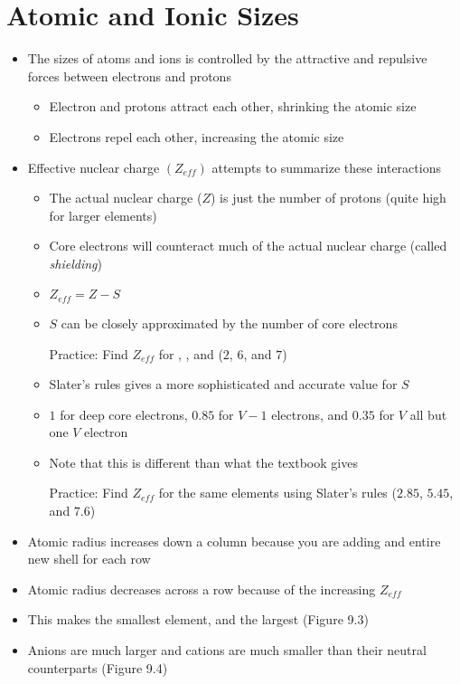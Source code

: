 \documentclass[12pt, openany, letterpaper]{memoir}
\begin{document}
\section{Atomic and Ionic Sizes}
\begin{itemize}
	\item The sizes of atoms and ions is controlled by the attractive and repulsive forces between electrons and protons
	      \begin{itemize}
		      \item Electron and protons attract each other, shrinking the atomic size
		      \item Electrons repel each other, increasing the atomic size
	      \end{itemize}
	\item Effective nuclear charge $\left(Z_{eff}\right)$ attempts to summarize these interactions
	      \begin{itemize}
		      \item The actual nuclear charge ($Z$) is just the number of protons (quite high for larger elements)
		      \item Core electrons will counteract much of the actual nuclear charge (called \emph{shielding})
		      \item $Z_{eff} = Z-S$
		      \item $S$ can be closely approximated by the number of core electrons

		            Practice: Find $Z_{eff}$ for , , and  ($2$, $6$, and $7$)
		      \item Slater's rules gives a more sophisticated and accurate value for $S$
		      \item $1$ for deep core electrons, $0.85$ for $V-1$ electrons, and $0.35$ for $V$ all but one $V$ electron
		      \item Note that this is different than what the textbook gives

		            Practice: Find $Z_{eff}$ for the same elements using Slater's rules ($2.85$, $5.45$, and $7.6$)
	      \end{itemize}
	\item Atomic radius increases down a column because you are adding and entire new shell for each row
	\item Atomic radius decreases across a row because of the increasing $Z_{eff}$
	\item This makes  the smallest element, and  the largest (Figure 9.3)
	\item Anions are much larger and cations are much smaller than their neutral counterparts (Figure 9.4)
\end{itemize}
\end{document}
